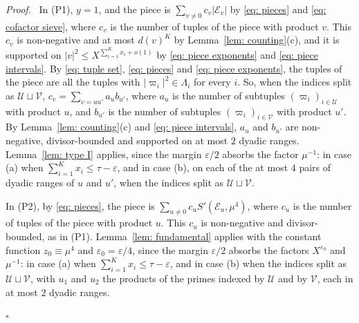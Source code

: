 \documentclass{article}
\numberwithin{equation}{section}
\newenvironment{proof}[1][Proof]{\par\medskip\noindent\textit{#1.}\ }{\hfill$\square$\par\medskip}
\newcommand{\Le}{\leqslant}
\begin{document}
\begin{proof}
In (P1), $y = 1$, and the piece is $\sum_{v \neq 0} c_v |\mathcal{E}_v|$ by \eqref{eq: pieces} and \eqref{eq: cofactor sieve}, where $c_v$ is the number of tuples of the piece with product $v$. This $c_v$ is non-negative and at most $d(v)^K$ by Lemma~\ref{lem: counting}(c), and it is supported on $|v|^2 \Le X^{\sum_{i=1}^{K} x_i + o(1)}$ by \eqref{eq: piece exponents} and \eqref{eq: piece intervals}. By \eqref{eq: tuple set}, \eqref{eq: pieces} and \eqref{eq: piece exponents}, the tuples of the piece are all the tuples with $|\varpi_i|^2 \in \Lambda_i$ for every $i$. So, when the indices split as $\mathcal{U} \sqcup \mathcal{V}$, $c_v = \sum_{v = uu'} a_u b_{u'}$, where $a_u$ is the number of subtuples $(\varpi_i)_{i \in \mathcal{U}}$ with product $u$, and $b_{u'}$ is the number of subtuples $(\varpi_i)_{i \in \mathcal{V}}$ with product $u'$. By Lemma~\ref{lem: counting}(c) and \eqref{eq: piece intervals}, $a_u$ and $b_{u'}$ are non-negative, divisor-bounded and supported on at most $2$ dyadic ranges. Lemma~\ref{lem: type I} applies, since the margin $\varepsilon/2$ absorbs the factor $\mu^{-1}$: in case (a) when $\sum_{i=1}^{K} x_i \Le \tau - \varepsilon$, and in case (b), on each of the at most $4$ pairs of dyadic ranges of $u$ and $u'$, when the indices split as $\mathcal{U} \sqcup \mathcal{V}$.

In (P2), by \eqref{eq: pieces}, the piece is $\sum_{u \neq 0} c_u S'(\mathcal{E}_u, \mu^4)$, where $c_u$ is the number of tuples of the piece with product $u$. This $c_u$ is non-negative and divisor-bounded, as in (P1). Lemma~\ref{lem: fundamental} applies with the constant function $z_0 \equiv \mu^4$ and $\varepsilon_0 = \varepsilon/4$, since the margin $\varepsilon/2$ absorbs the factors $X^{\varepsilon_0}$ and $\mu^{-1}$: in case (a) when $\sum_{i=1}^{K} x_i \Le \tau - \varepsilon$, and in case (b) when the indices split as $\mathcal{U} \sqcup \mathcal{V}$, with $u_1$ and $u_2$ the products of the primes indexed by $\mathcal{U}$ and by $\mathcal{V}$, each in at most $2$ dyadic ranges.


\end{proof}
\end{document}
